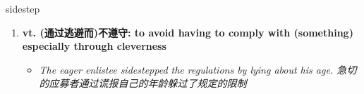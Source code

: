 
\begin{frame}
{\huge sidestep}
\begin{center}
\begin{enumerate}\Large
  \item \textbf{vt. (通过逃避而)不遵守: to avoid having to comply with (something) especially through cleverness}
  \begin{itemize}
    \item \em{\Large{The eager enlistee sidestepped the regulations by lying about his age. 急切的应募者通过谎报自己的年龄躲过了规定的限制}}
  \end{itemize}
\end{enumerate}
\end{center}
\end{frame}
